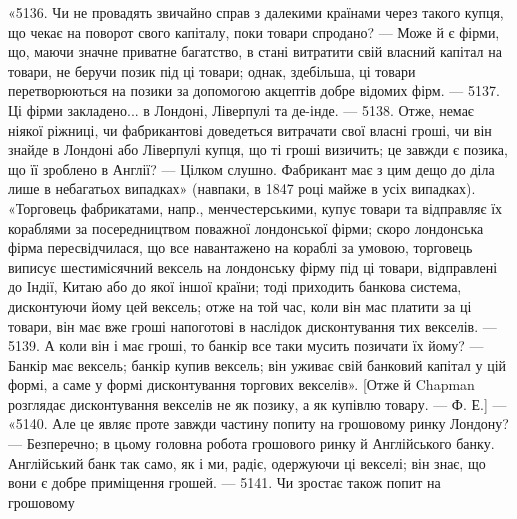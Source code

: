 «5136. Чи не провадять звичайно справ з далекими країнами через такого
купця, що чекає на поворот свого капіталу, поки товари спродано? — Може й
є фірми, що, маючи значне приватне багатство, в стані витратити свій власний
капітал на товари, не беручи позик під ці товари; однак, здебільша, ці товари
перетворюються на позики за допомогою акцептів добре відомих фірм. — 5137.
Ці фірми закладено... в Лондоні, Ліверпулі та де-інде. — 5138. Отже, немає ніякої
ріжниці, чи фабрикантові доведеться витрачати свої власні гроші, чи він знайде
в Лондоні або Ліверпулі купця, що ті гроші визичить; це завжди є позика, що
її зроблено в Англії? — Цілком слушно. Фабрикант має з цим дещо до діла лише
в небагатьох випадках» (навпаки, в 1847 році майже в усіх випадках). «Торговець
фабрикатами, напр., менчестерськими, купує товари та відправляє їх
кораблями за посередництвом поважної лондонської фірми; скоро лондонська фірма
пересвідчилася, що все навантажено на кораблі за умовою, торговець виписує
шестимісячний вексель на лондонську фірму під ці товари, відправлені до Індії,
Китаю або до якої іншої країни; тоді приходить банкова система, дисконтуючи
йому цей вексель; отже на той час, коли він мас платити за ці товари, він
має вже гроші напоготові в наслідок дисконтування тих векселів. — 5139. А коли
він і має гроші, то банкір все таки мусить позичати їх йому? — Банкір має
вексель; банкір купив вексель; він уживає свій банковий капітал у цій формі,
а саме у формі дисконтування торгових векселів». [Отже й Chapman розглядає
дисконтування векселів не як позику, а як купівлю товару. — Ф. Е.] — «5140.
Але це являє проте завжди частину попиту на грошовому ринку Лондону? —
Безперечно; в цьому головна робота грошового ринку й Англійського банку.
Англійський банк так само, як і ми, радіє, одержуючи ці векселі; він знає, що
вони є добре приміщення грошей. — 5141. Чи зростає також попит на грошовому
\parbreak{}  %
